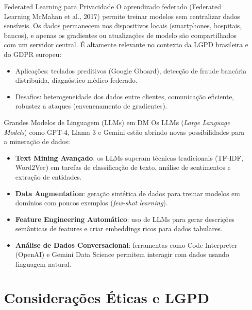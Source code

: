 \documentclass[12pt,a4paper]{article}
\begin{document}
\begin{estadoartebox}{Federated Learning para Privacidade}
O aprendizado federado (Federated Learning McMahan et al., 2017) permite treinar modelos sem centralizar dados sensíveis. Os dados permanecem nos dispositivos locais (smartphones, hospitais, bancos), e apenas os gradientes ou atualizações de modelo são compartilhados com um servidor central. É altamente relevante no contexto da LGPD brasileira e do GDPR europeu:

\begin{itemize}[leftmargin=*]
  \item Aplicações: teclados preditivos (Google Gboard), detecção de fraude bancária distribuída, diagnóstico médico federado.
  \item Desafios: heterogeneidade dos dados entre clientes, comunicação eficiente, robustez a ataques (envenenamento de gradientes).
\end{itemize}
\end{estadoartebox}

\begin{estadoartebox}{Grandes Modelos de Linguagem (LLMs) em DM}
Os LLMs (\textit{Large Language Models}) como GPT-4, Llama 3 e Gemini estão abrindo novas possibilidades para a mineração de dados:

\begin{itemize}[leftmargin=*]
  \item \textbf{Text Mining Avançado}: os LLMs superam técnicas tradicionais (TF-IDF, Word2Vec) em tarefas de classificação de texto, análise de sentimentos e extração de entidades.
  \item \textbf{Data Augmentation}: geração sintética de dados para treinar modelos em domínios com poucos exemplos (\textit{few-shot learning}).
  \item \textbf{Feature Engineering Automático}: uso de LLMs para gerar descrições semânticas de features e criar embeddings ricos para dados tabulares.
  \item \textbf{Análise de Dados Conversacional}: ferramentas como Code Interpreter (OpenAI) e Gemini Data Science permitem interagir com dados usando linguagem natural.
\end{itemize}
\end{estadoartebox}

\section{Considerações Éticas e LGPD}
\end{document}
